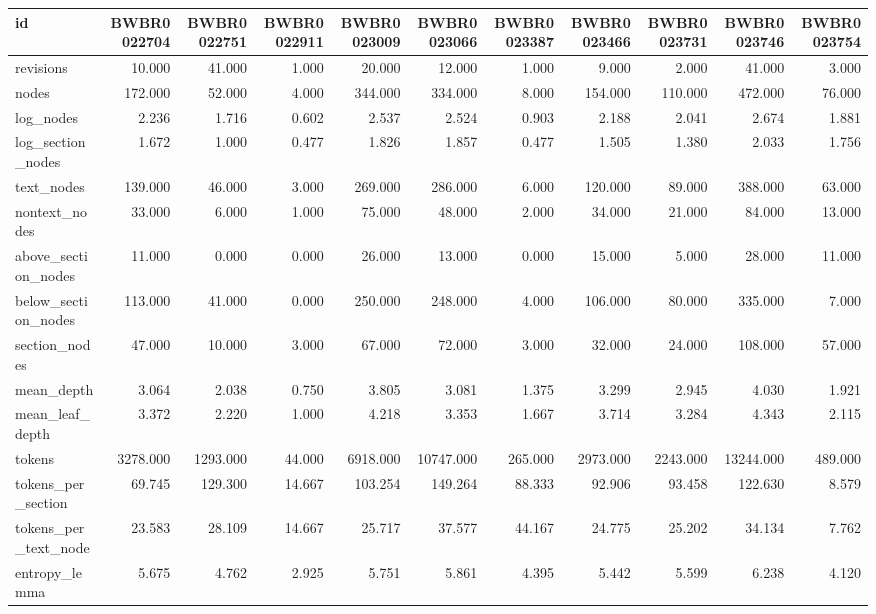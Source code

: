 \begin{tabular}{lrrrrrrrrrr}
\toprule
id & BWBR0022704 & BWBR0022751 & BWBR0022911 & BWBR0023009 & BWBR0023066 & BWBR0023387 & BWBR0023466 & BWBR0023731 & BWBR0023746 & BWBR0023754 \\
\midrule
revisions & 10.000 & 41.000 & 1.000 & 20.000 & 12.000 & 1.000 & 9.000 & 2.000 & 41.000 & 3.000 \\
\cline{1-11}
nodes & 172.000 & 52.000 & 4.000 & 344.000 & 334.000 & 8.000 & 154.000 & 110.000 & 472.000 & 76.000 \\
\cline{1-11}
log\_nodes & 2.236 & 1.716 & 0.602 & 2.537 & 2.524 & 0.903 & 2.188 & 2.041 & 2.674 & 1.881 \\
\cline{1-11}
log\_section\_nodes & 1.672 & 1.000 & 0.477 & 1.826 & 1.857 & 0.477 & 1.505 & 1.380 & 2.033 & 1.756 \\
\cline{1-11}
text\_nodes & 139.000 & 46.000 & 3.000 & 269.000 & 286.000 & 6.000 & 120.000 & 89.000 & 388.000 & 63.000 \\
\cline{1-11}
nontext\_nodes & 33.000 & 6.000 & 1.000 & 75.000 & 48.000 & 2.000 & 34.000 & 21.000 & 84.000 & 13.000 \\
\cline{1-11}
above\_section\_nodes & 11.000 & 0.000 & 0.000 & 26.000 & 13.000 & 0.000 & 15.000 & 5.000 & 28.000 & 11.000 \\
\cline{1-11}
below\_section\_nodes & 113.000 & 41.000 & 0.000 & 250.000 & 248.000 & 4.000 & 106.000 & 80.000 & 335.000 & 7.000 \\
\cline{1-11}
section\_nodes & 47.000 & 10.000 & 3.000 & 67.000 & 72.000 & 3.000 & 32.000 & 24.000 & 108.000 & 57.000 \\
\cline{1-11}
mean\_depth & 3.064 & 2.038 & 0.750 & 3.805 & 3.081 & 1.375 & 3.299 & 2.945 & 4.030 & 1.921 \\
\cline{1-11}
mean\_leaf\_depth & 3.372 & 2.220 & 1.000 & 4.218 & 3.353 & 1.667 & 3.714 & 3.284 & 4.343 & 2.115 \\
\cline{1-11}
tokens & 3278.000 & 1293.000 & 44.000 & 6918.000 & 10747.000 & 265.000 & 2973.000 & 2243.000 & 13244.000 & 489.000 \\
\cline{1-11}
tokens\_per\_section & 69.745 & 129.300 & 14.667 & 103.254 & 149.264 & 88.333 & 92.906 & 93.458 & 122.630 & 8.579 \\
\cline{1-11}
tokens\_per\_text\_node & 23.583 & 28.109 & 14.667 & 25.717 & 37.577 & 44.167 & 24.775 & 25.202 & 34.134 & 7.762 \\
\cline{1-11}
entropy\_lemma & 5.675 & 4.762 & 2.925 & 5.751 & 5.861 & 4.395 & 5.442 & 5.599 & 6.238 & 4.120 \\

\end{tabular}
